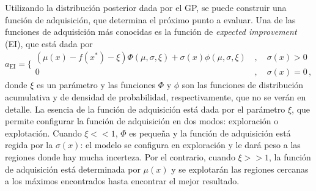 Utilizando la distribución posterior dada por el GP, se puede construir 
una función de adquisición, que determina el próximo punto a evaluar.
Una de las funciones de adquisición más conocidas es la función de 
\textit{expected improvement} (EI), que está dada por
\begin{equation}
 a_{\mathrm{EI}} = \bigg\{
 \begin{array}{ll}
 (\mu(x)-f(x^*)-\xi)\Phi(\mu,\sigma,\xi) 
 + \sigma(x)\phi(\mu,\sigma,\xi) &\,,\quad\sigma(x)>0\\
 0 &\,,\quad\sigma(x)=0\,,
 \end{array}
\end{equation}
donde $\xi$ es un parámetro y las funciones $\Phi$ y $\phi$ son las 
funciones de distribución acumulativa y de densidad de probabilidad, 
respectivamente, que no se verán en detalle. La esencia de la función 
de adquisición está dada por el parámetro $\xi$, que permite configurar 
la función de adquisición en dos modos: exploración o explotación. 
Cuando $\xi<<1$, $\Phi$ es pequeña y la función de adquisición está 
regida por la $\sigma(x)$: el modelo se configura en exploración y le 
dará peso a las regiones donde hay mucha incerteza. Por el contrario,
cuando $\xi>>1$, la función de adquisición está determinada por $\mu(x)$ 
y se explotarán las regiones cercanas a los máximos encontrados hasta 
encontrar el mejor resultado. 


